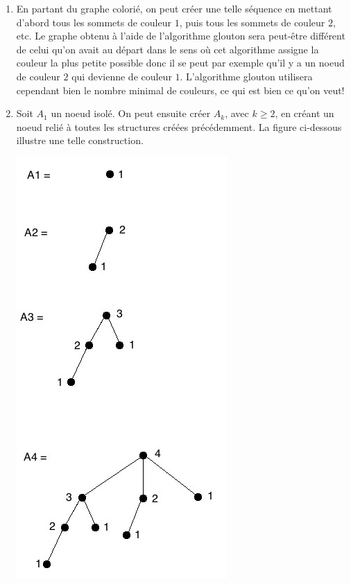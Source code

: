 \begin{solution}
  \begin{enumerate}
    \item En partant du graphe colorié, on peut créer une telle séquence en mettant d'abord tous les sommets de couleur $1$, puis tous les sommets de couleur $2$, etc. Le graphe obtenu à l'aide de l'algorithme glouton sera peut-être différent de celui qu'on avait au départ dans le sens où cet algorithme assigne la couleur la plus petite possible donc il se peut par exemple qu'il y a un noeud de couleur $2$ qui devienne de couleur $1$. L'algorithme glouton utilisera cependant bien le nombre minimal de couleurs, ce qui est bien ce qu'on veut!
    \item  Soit $A_1$ un noeud isolé. On peut ensuite créer $A_k$, avec $k \geq 2$, en créant un noeud relié à toutes les structures créées précédemment. La figure  ci-dessous illustre une telle construction.
    \begin{center}
    	\includegraphics[scale=0.6]{seance8ex4}
     \end{center}
  \end{enumerate}
\end{solution}


